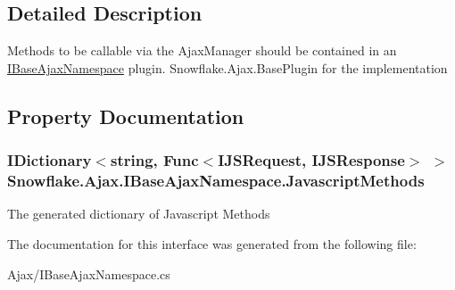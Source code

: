 \subsection{Detailed Description}
Methods to be callable via the Ajax\+Manager should be contained in an \hyperlink{interface_snowflake_1_1_ajax_1_1_i_base_ajax_namespace}{I\+Base\+Ajax\+Namespace} plugin. Snowflake.\+Ajax.\+Base\+Plugin for the implementation 



\subsection{Property Documentation}
\hypertarget{interface_snowflake_1_1_ajax_1_1_i_base_ajax_namespace_a2b4acf2a85e2c08b0037604021670df0}{}
\subsubsection[{Javascript\+Methods}]{\setlength{\rightskip}{0pt plus 5cm}I\+Dictionary$<$string, Func$<${\bf I\+J\+S\+Request}, {\bf I\+J\+S\+Response}$>$ $>$ Snowflake.\+Ajax.\+I\+Base\+Ajax\+Namespace.\+Javascript\+Methods\hspace{0.3cm}{\ttfamily [get]}}\label{interface_snowflake_1_1_ajax_1_1_i_base_ajax_namespace_a2b4acf2a85e2c08b0037604021670df0}


The generated dictionary of Javascript Methods 



The documentation for this interface was generated from the following file\+:\begin{DoxyCompactItemize}
\item 
Ajax/I\+Base\+Ajax\+Namespace.\+cs\end{DoxyCompactItemize}
